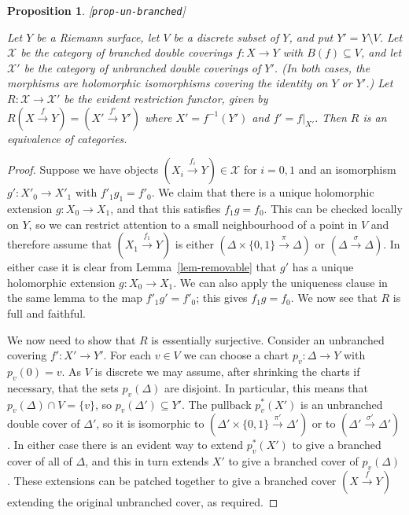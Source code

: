 \documentclass[reqno]{amsart}
\newcommand{\lbl}[1]{\label{#1}\textup{[\texttt{#1}]}\par}
\newcommand{\lbl}{\label}
\newcommand{\Dl}        {\Delta}
\newcommand{\sg}        {\sigma}
\newcommand{\xra}       {\xrightarrow}
\newcommand{\tm}        {\times}
\newcommand{\sm}        {\setminus}
\newcommand{\sse}       {\subseteq}
\newcommand{\CX}        {\mathcal{X}}
\renewcommand{\:}{\colon}
\newtheorem{proposition}[theorem]{Proposition}
\theoremstyle{definition}
\begin{document}
\begin{proposition}\lbl{prop-un-branched}
 Let $Y$ be a Riemann surface, let $V$ be a discrete subset of $Y$,
 and put $Y'=Y\sm V$.  Let $\CX$ be the category of branched double
 coverings $f\:X\to Y$ with $B(f)\sse V$, and let $\CX'$ be the
 category of unbranched double coverings of $Y'$.  (In both cases, the
 morphisms are holomorphic isomorphisms covering the identity on $Y$
 or $Y'$.)  Let $R\:\CX\to\CX'$ be the evident restriction functor,
 given by $R(X\xra{f}Y)=(X'\xra{f'}Y')$ where $X'=f^{-1}(Y')$ and
 $f'=f|_{X'}$.   Then $R$ is an equivalence of categories.
\end{proposition}
\begin{proof}
 Suppose we have objects $(X_i\xra{f_i}Y)\in\CX$ for $i=0,1$ and an
 isomorphism $g'\:X'_0\to X'_1$ with $f'_1g_1=f'_0$.  We claim that
 there is a unique holomorphic extension $g\:X_0\to X_1$, and that
 this satisfies $f_1g=f_0$.  This can be checked locally on $Y$, so we
 can restrict attention to a small neighbourhood of a point in $V$ and
 therefore assume that $(X_1\xra{f_1}Y)$ is either
 $(\Dl\tm\{0,1\}\xra{\pi}\Dl)$ or $(\Dl\xra{\sg}\Dl)$.  In either case it is
 clear from Lemma~\ref{lem-removable} that $g'$ has a unique
 holomorphic extension $g\:X_0\to X_1$.  We can also apply the
 uniqueness clause in the same lemma to the map $f'_1g'=f'_0$; this
 gives $f_1g=f_0$.  We now see that $R$ is full and faithful.

 We now need to show that $R$ is essentially surjective.  Consider an
 unbranched covering $f'\:X'\to Y'$.  For each $v\in V$ we can choose
 a chart $p_v\:\Dl\to Y$ with $p_v(0)=v$.  As $V$ is discrete we may
 assume, after shrinking the charts if necessary, that the sets
 $p_v(\Dl)$ are disjoint.  In particular, this means that
 $p_v(\Dl)\cap V=\{v\}$, so $p_v(\Dl')\sse Y'$.  The pullback $p_v^*(X')$
 is an unbranched double cover of $\Dl'$, so it is isomorphic to
 $(\Dl'\tm\{0,1\}\xra{\pi'}\Dl')$ or to $(\Dl'\xra{\sg'}\Dl')$.  In either
 case there is an evident way to extend $p_v^*(X')$ to give a branched
 cover of all of $\Dl$, and this in turn extends $X'$ to give a branched
 cover of $p_v(\Dl)$.  These extensions can be patched together to give
 a branched cover $(X\xra{f}Y)$ extending the original unbranched
 cover, as required.
\end{proof}
\end{document}
